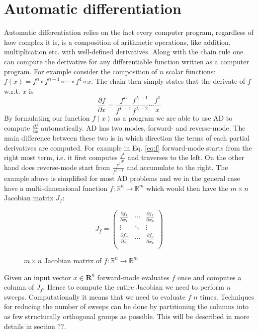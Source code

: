 \section{Automatic differentiation}
Automatic differentiation relies on the fact every computer program, regardless of how complex it is, 
is a composition of arithmetic operations, like addition, multiplication etc. with well-defined derivatives. Along with the chain rule one can compute the derivative for any differentiable function written as a computer program.  For example consider the composition of $n$ scalar functions:
$f(x) = f^n \circ f^{n-1} \circ \cdots \circ f^1 \circ x$. The chain then simply states that the derivate of 
$f$ w.r.t. $x$ is 
\begin{equation}
\frac{\partial f}{\partial x} = \frac{f^L}{f^{L-1}} \frac{f^{L-1}}{f^{L-2}} \cdots \frac{f^1}{x}
\label{eq:f}
\end{equation}
By formulating our function $f(x)$ as a program we are able to use AD to compute $\frac{\partial f}{\partial x}$ automatically. AD has two modes, forward- and reverse-mode.
The main difference between these two is in which direction the terms of each partial derivatives
are computed. For example in Eq. \ref{eq:f} forward-mode starts from the right most term, i.e. it first computes $\frac{f^1}{x}$
and traverses to the left. On the other hand does reverse-mode start from $\frac{f^L}{f^{L-1}}$ and accumulate to the right. \newline 
The example above is simplified for most AD problems and we in the general case 
have a multi-dimensional function $f : \mathbb{R}^n \to \mathbb{R}^m$  which would then have the $m\times n$  Jacobian matrix $J_f$:
\begin{figure}[H]
	$$ J_{f} = \left(\begin{matrix}
	\frac{\partial f_1}{\partial x_1} & \cdots & \frac{\partial f_1}{\partial x_n} \\
    \vdots & \ddots & \vdots \\
	\frac{\partial f_m}{\partial x_1} & \cdots  &  \frac{\partial f_3}{\partial x_n}\\
	\end{matrix}\right) $$
	\caption{$m\times n$ Jacobian matrix of $f : \mathbb{R}^n \to \mathbb{R}^m$}
\end{figure}
Given an input vector $x \in \mathbf{R}^n$  forward-mode evaluates $f$ once and computes a column of $J_f$. Hence to compute the entire Jacobian we need to perform $n$ sweeps. Computationally it means that we need to evaluate $f$ $n$ times. Techniques for reducing the number of sweeps can be done by partitioning the columns into as few structurally orthogonal groups as possible. This will be described in more details in section ??.

